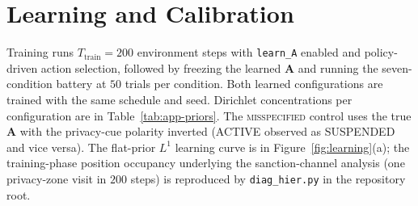 \documentclass[10pt,twocolumn]{article}
\begin{document}
\begin{table}[H]
\centering
\scriptsize
{}
\caption{Benchmark configuration for Section~5.4. The Python-loop measurement dispatches each inference--planning--sampling step to JAX individually; the compiled measurement wraps the same cycle in \texttt{jax.lax.scan}.}
\label{tab:app-bench}
\end{table}

\section{Learning and Calibration}
\label{app:learning}

Training runs $T_{\text{train}} = 200$ environment steps with \texttt{learn\_A} enabled and policy-driven action selection, followed by freezing the learned $\mathbf{A}$ and running the seven-condition battery at $50$ trials per condition. Both learned configurations are trained with the same schedule and seed. Dirichlet concentrations per configuration are in Table~\ref{tab:app-priors}. The \textsc{misspecified} control uses the true $\mathbf{A}$ with the privacy-cue polarity inverted (ACTIVE observed as SUSPENDED and vice versa). The flat-prior $L^1$ learning curve is in Figure~\ref{fig:learning}(a); the training-phase position occupancy underlying the sanction-channel analysis (one privacy-zone visit in $200$ steps) is reproduced by \texttt{diag\_hier.py} in the repository root.
\end{document}
